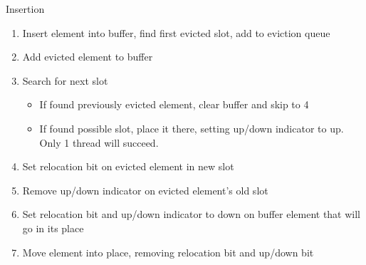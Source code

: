 \documentclass{article}
\begin{document}
Insertion
\begin{enumerate}
\item Insert element into buffer, find first evicted slot, add to eviction queue
\item Add evicted element to buffer
\item Search for next slot
\begin{itemize}
\item If found previously evicted element, clear buffer and skip to 4
\item If found possible slot, place it there, setting up/down indicator to up. Only 1 thread will succeed.
\end{itemize}
\item Set relocation bit on evicted element in new slot
\item Remove up/down indicator on evicted element's old slot
\item Set relocation bit and up/down indicator to down on buffer element that will go in its place
\item Move element into place, removing relocation bit and up/down bit
\end{enumerate}
\end{document}
